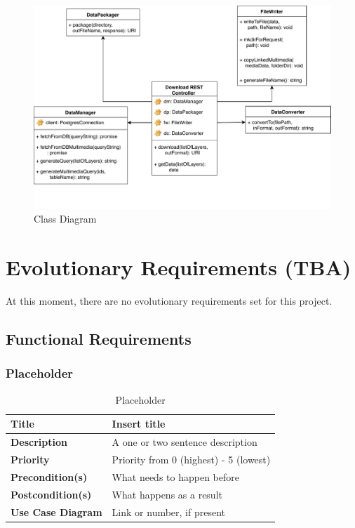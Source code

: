 \documentclass{article}
\begin{document}
\begin{figure}[H]
	\begin{center}
		\caption{Class Diagram}
		\label{class-diagram}
		\includegraphics[width=\textwidth]{../sas/images/class_diagram.pdf}
	\end{center}
\end{figure}

\clearpage

\section{Evolutionary Requirements (TBA)}

At this moment, there are no evolutionary requirements set for this project.

\subsection{Functional Requirements}


\subsubsection{Placeholder}

\begin{table}[H]
	\caption{Placeholder}
	\begin{tabularx}{\textwidth}{|l|X|}
		\hline
		\textbf{Title}            & Insert title                           \\ \hline
		\textbf{Description}      & A one or two sentence description      \\ \hline
		\textbf{Priority}         & Priority from 0 (highest) - 5 (lowest) \\ \hline
		\textbf{Precondition(s)}  & What needs to happen before            \\ \hline
		\textbf{Postcondition(s)} & What happens as a result               \\ \hline
		\textbf{Use Case Diagram} & Link or number, if present             \\  \hline
	\end{tabularx}
\end{table}
\end{document}

